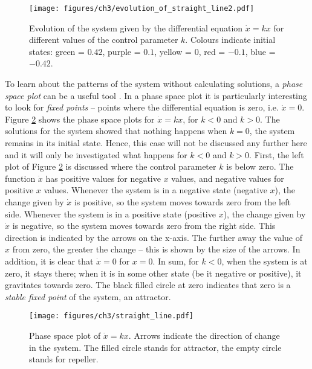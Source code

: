 \begin{figure}
\texttt{[image: figures/ch3/evolution\_of\_straight\_line2.pdf]}
\caption[Evolution of the system given by the differential equation $\dot{x} = kx$ for different values of the control parameter $k$.]{Evolution of the system given by the differential equation $\dot{x} = kx$ for different values of the control parameter $k$. Colours indicate initial states: green = $0.42$, purple = $0.1$, yellow = $0$, red = $-0.1$, blue = $-0.42$.}
\label{fig:evolution_of_straight_line2}
\end{figure}

To learn about the patterns of the system without calculating solutions, a \emph{phase space plot} can be a useful tool \citep{Fuchs2013}. In a phase space plot it is particularly interesting to look for \emph{fixed points} -- points where the differential equation is zero, i.e. $\dot{x} = 0$. Figure \ref{fig:phase_space_straight_line} shows the phase space plots for $\dot{x} = kx$, for $k<0$ and $k>0$. The solutions for the system showed that nothing happens when $k = 0$, the system remains in its initial state. Hence, this case will not be discussed any further here and it will only be investigated what happens for $k < 0$ and $k > 0$. First, the left plot of Figure \ref{fig:phase_space_straight_line} is discussed where the control parameter $k$ is below zero. The function $\dot{x}$ has positive values for negative $x$ values, and negative values for positive $x$ values. Whenever the system is in a negative state (negative $x$), the change given by $\dot{x}$ is positive, so the system moves towards zero from the left side. Whenever the system is in a positive state (positive $x$), the change given by $\dot{x}$ is negative, so the system moves towards zero from the right side. This direction is indicated by the arrows on the x-axis. The further away the value of $x$ from zero, the greater the change -- this is shown by the size of the arrows. In addition, it is clear that $\dot{x} = 0$ for $x=0$. In sum, for $k<0$, when the system is at zero, it stays there; when it is in some other state (be it negative or positive), it gravitates towards zero. The black filled circle at zero indicates that zero is a \emph{stable fixed point} of the system, an attractor. 

\begin{figure}
\texttt{[image: figures/ch3/straight\_line.pdf]}
\caption[Phase space plot of $\dot{x} = kx$.]{Phase space plot of $\dot{x} = kx$. Arrows indicate the direction of change in the system. The filled circle stands for attractor, the empty circle stands for repeller.}
\label{fig:phase_space_straight_line}
\end{figure}

